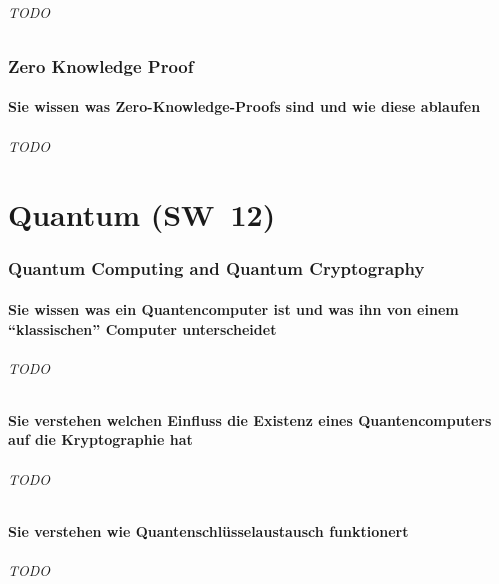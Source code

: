 \documentclass[10pt,a4paper]{article}
\begin{document}
\paragraph*{TODO}

\section{Zero Knowledge Proof}
\subsection*{Sie wissen was Zero-Knowledge-Proofs sind und wie diese ablaufen}
\paragraph*{TODO}


\part{Quantum (SW~12)}
\section{Quantum Computing and Quantum Cryptography}
\subsection*{Sie wissen was ein Quantencomputer ist und was ihn von einem "`klassischen"' Computer unterscheidet}
\paragraph*{TODO}

\subsection*{Sie verstehen welchen Einfluss die Existenz eines Quantencomputers auf die Kryptographie hat}
\paragraph*{TODO}

\subsection*{Sie verstehen wie Quantenschlüsselaustausch funktionert}
\paragraph*{TODO}
\end{document}
